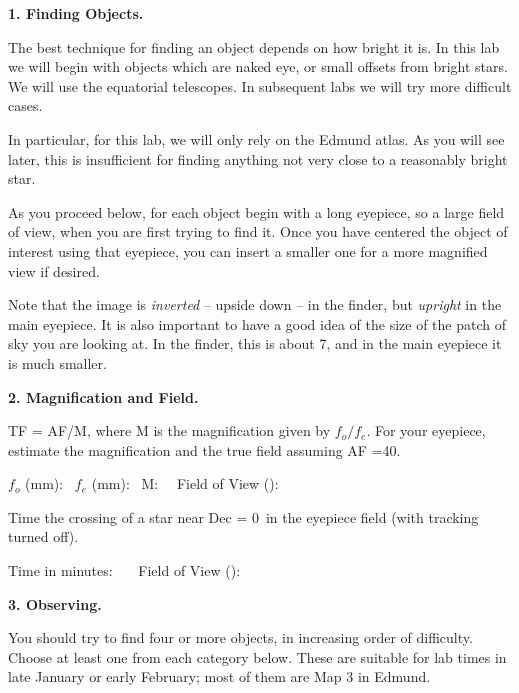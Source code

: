
\noindent
{\bf 1. Finding Objects.}  

\noindent The best technique for finding an object depends on how
bright it is. In this lab we will begin with objects which are naked
eye, or small offsets from bright stars. We will use the equatorial
telescopes. In subsequent labs we will try more difficult cases.

\medskip\noindent In particular, for this lab, we will only rely on
the Edmund atlas.  As you will see later, this is insufficient for
finding anything not very close to a reasonably bright star.

\medskip\noindent As you proceed below, for each object begin with a
long eyepiece, so a large field of view, when you are first trying to
find it. Once you have centered the object of interest using that
eyepiece, you can insert a smaller one for a more magnified view if
desired.

\medskip\noindent Note that the image is \emph{inverted} -- upside
down -- in the finder, but \emph{upright} in the main eyepiece. It is
also important to have a good idea of the size of the patch of sky
you are looking at. In the finder, this is about 7\deg, and in the
main eyepiece it is much smaller.

\bigskip
\bigskip
\bigskip
\noindent
{\bf 2. Magnification and Field.}

\medskip{} TF = AF/M, where M
is the magnification given by $f_o/f_e$. For your eyepiece, estimate
the magnification and the true field assuming AF =40\deg.

\medskip\noindent $f_o$ (mm): \makebox[1.5cm]{\hrulefill} \ $f_e$
(mm): \makebox[1.5cm]{\hrulefill} \ M: \makebox[1.5cm]{\hrulefill} \ \
Field of View (\arcmin):\makebox[2cm]{\hrulefill}


\medskip{} Time the crossing of a star
near Dec = 0\deg\ in the eyepiece field (with tracking turned off).

\medskip\noindent Time in minutes: \makebox[2cm]{\hrulefill} \ \ \ Field
of View (\arcmin): \makebox[2cm]{\hrulefill}

\bigskip
\bigskip
\bigskip\noindent
{\bf 3. Observing.} 

\medskip\noindent You should try to find four or more objects, in
increasing order of difficulty. Choose at least one from each category
below. These are suitable for lab times in late January or early
February; most of them are Map 3 in Edmund.


